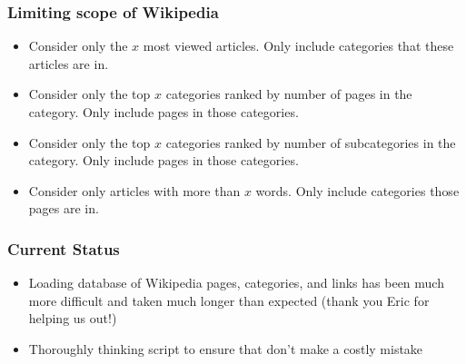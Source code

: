 \documentclass{beamer}
\begin{document}
\begin{frame}
\frametitle{Limiting scope of Wikipedia}

\begin{itemize}
\item Consider only the $x$ most viewed articles. Only include categories that
  these articles are in.

\item Consider only the top $x$ categories ranked by number of pages in the
  category. Only include pages in those categories.

\item Consider only the top $x$ categories ranked by number of subcategories in the
  category. Only include pages in those categories.

\item Consider only articles with more than $x$ words. Only include categories
  those pages are in.
\end{itemize}

\end{frame}

\begin{frame}
  \frametitle{Current Status}
  \begin{itemize}
  \item Loading database of Wikipedia pages, categories, and links has been much
    more difficult and taken much longer than expected (thank you Eric for
    helping us out!)
    \item Thoroughly thinking script to ensure that don't make a costly mistake
  \end{itemize}

\end{frame}
\end{document}
